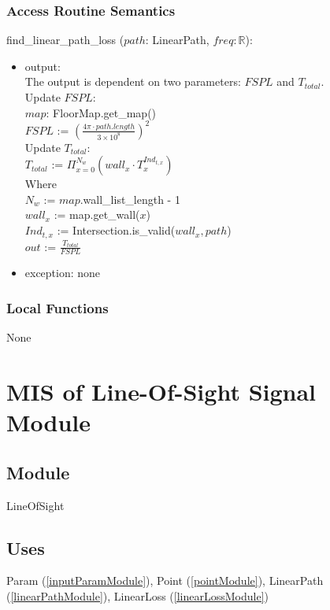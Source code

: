 \documentclass[12pt, titlepage]{article}
\begin{document}
\subsubsection{Access Routine Semantics}

\noindent find\_linear\_path\_loss ($path$: LinearPath, $freq:\mathbb{R}$):
\begin{itemize}
\item output: \\
The output is dependent on two parameters: $FSPL$ and $T_{total}$.\\
Update $FSPL$:\\
$map$: FloorMap.get\_map()\\
$FSPL$ := $(\frac{4\pi \cdot path.length}{3\times10^8})^2$\\

Update $T_{total}$:\\
$T_{total}$ := $\Pi_{x=0}^{N_w}(wall_x \cdot T_x^{Ind_{t,x}})$\\
Where\\
$N_w$ := $map$.wall\_list\_length - 1\\
$wall_x$ := map.get\_wall($x$)\\
$Ind_{t,x}$ := Intersection.is\_valid($wall_x, path$)\\

$out$ := $\frac{T_{total}}{FSPL}$
\item exception: none
\end{itemize}

\subsubsection{Local Functions}
None



\newpage
\section{MIS of Line-Of-Sight Signal Module} \label{losModule}

\subsection{Module}

LineOfSight

\subsection{Uses}
Param (\autoref{inputParamModule}), Point (\autoref{pointModule}), LinearPath (\autoref{linearPathModule}),  LinearLoss (\autoref{linearLossModule})
\end{document}
